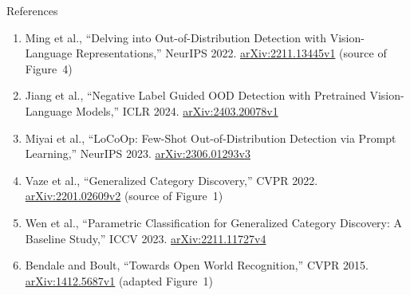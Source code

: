 \begin{frame}[allowframebreaks]{References}
\begin{enumerate}
    \item Ming et al., ``Delving into Out-of-Distribution Detection with Vision-Language Representations,'' NeurIPS 2022. \href{https://arxiv.org/abs/2211.13445v1}{arXiv:2211.13445v1} (source of Figure~4)
    \item Jiang et al., ``Negative Label Guided OOD Detection with Pretrained Vision-Language Models,'' ICLR 2024. \href{https://arxiv.org/abs/2403.20078v1}{arXiv:2403.20078v1}
    \item Miyai et al., ``LoCoOp: Few-Shot Out-of-Distribution Detection via Prompt Learning,'' NeurIPS 2023. \href{https://arxiv.org/abs/2306.01293v3}{arXiv:2306.01293v3}
    \item Vaze et al., ``Generalized Category Discovery,'' CVPR 2022. \href{https://arxiv.org/abs/2201.02609v2}{arXiv:2201.02609v2} (source of Figure~1)
    \item Wen et al., ``Parametric Classification for Generalized Category Discovery: A Baseline Study,'' ICCV 2023. \href{https://arxiv.org/abs/2211.11727v4}{arXiv:2211.11727v4}
    \item Bendale and Boult, ``Towards Open World Recognition,'' CVPR 2015. \href{https://arxiv.org/abs/1412.5687v1}{arXiv:1412.5687v1} (adapted Figure~1)
  \end{enumerate}
\end{frame}
